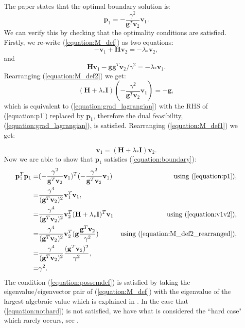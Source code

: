 \documentclass[letterpaper,12pt,titlepage,oneside,final]{book}
\begin{document}
	The paper states that the optimal boundary solution is:
	\begin{equation}
	\mathbf{p}_{1} = - \frac{\gamma^{2}}{\mathbf{g}^{T}\mathbf{v}_{2}}\mathbf{v}_{1}.
	\label{equation:p1}
	\end{equation}
	We can verify this by checking that the optimality conditions are satisfied. Firstly, we re-write (\ref{equation:M_def}) as two equations:
	\begin{equation}
	-\mathbf{v}_{1} + \mathbf{H}\mathbf{v}_{2} = -\lambda_{*}\mathbf{v}_{2},
	\label{equation:M_def1}
	\end{equation}
	and
	\begin{equation}
	\mathbf{H}\mathbf{v}_{1}-\mathbf{gg}^{T}\mathbf{v}_{2}/\gamma^{2} = -\lambda_{*}\mathbf{v}_{1}.
	\label{equation:M_def2}
	\end{equation}
	Rearranging (\ref{equation:M_def2}) we get:
	\begin{equation}
	(\mathbf{H} + \lambda_{*}\mathbf{I})(- \frac{\gamma^{2}}{\mathbf{g}^{T}\mathbf{v}_{2}}\mathbf{v}_{1}) = -\mathbf{g},
	\label{equation:M_def2_rearranged}
	\end{equation}
	which is equivalent to (\ref{equation:grad_lagrangian}) with the RHS of (\ref{equation:p1}) replaced by $\mathbf{p}_{1}$, therefore the dual feasibility, (\ref{equation:grad_lagrangian}), is satisfied. Rearranging (\ref{equation:M_def1}) we get:
	
	\begin{equation}
	\mathbf{v}_{1} = (\mathbf{H} + \lambda_{*}\mathbf{I})\mathbf{v}_{2}.
	\label{equation:v1v2}
	\end{equation}
	Now we are able to show that $\mathbf{p}_{1}$ satisfies (\ref{equation:boundary}):
	\begin{align*}
	\mathbf{p}_{1}^{T}\mathbf{p}_{1} =  & (- \frac{\gamma^{2}}{\mathbf{g}^{T}\mathbf{v}_{2}}\mathbf{v}_{1})^{T}(- \frac{\gamma^{2}}{\mathbf{g}^{T}\mathbf{v}_{2}}\mathbf{v}_{1}) & \text{using (\ref{equation:p1})},\\
	= & \frac{\gamma^{4}}{(\mathbf{g}^{T}\mathbf{v}_{2})^{2}}\mathbf{v}_{1}^{T}\mathbf{v}_{1}, \\
	= & \frac{\gamma^{4}}{(\mathbf{g}^{T}\mathbf{v}_{2})^{2}}\mathbf{v}_{2}^{T}(\mathbf{H} + \lambda_{*}\mathbf{I})^{T}\mathbf{v}_{1} & \text{using (\ref{equation:v1v2}),} \\ 
	= & \frac{\gamma^{4}}{(\mathbf{g}^{T}\mathbf{v}_{2})^{2}}\mathbf{v}_{2}^{T}(\mathbf{g}\frac{\mathbf{g}^{T}\mathbf{v}_{2}}{\gamma^{2}}) & \text{using (\ref{equation:M_def2_rearranged})},\\
	= & \frac{\gamma^{4}}{(\mathbf{g}^{T}\mathbf{v}_{2})^{2}}\frac{(\mathbf{g}^{T}\mathbf{v}_{2})^{2}}{\gamma^{2}}, \\
	= &\gamma^{2}.
	\end{align*}
	The condition (\ref{equation:possemdef}) is satisfied by taking the eigenvalue/eigenvector pair of (\ref{equation:M_def}) with the eigenvalue of the largest algebraic value which is explained in \cite{adachi.paper}. In the case that (\ref{equation:nothard}) is not satisfied, we have what is considered the ``hard case" which rarely occurs, see \cite{adachi.paper}. 
	
\end{document}

